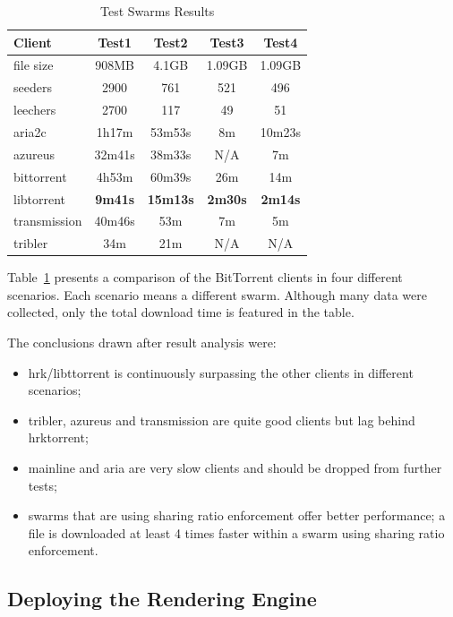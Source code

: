 \begin{table}[ht]
  \centering
  \begin{tabular}{@{}lcccc@{}}
    \toprule
    \textbf{Client} & \textbf{Test1} & \textbf{Test2} & \textbf{Test3} &
    \textbf{Test4} \\
    \midrule
    file size & 908MB & 4.1GB & 1.09GB & 1.09GB	\\
    seeders & 2900 & 761 & 521 & 496	\\
    leechers & 2700 & 117 & 49 & 51	\\
    \midrule
    aria2c & 1h17m & 53m53s & 8m & 10m23s	\\
    azureus & 32m41s & 38m33s & N/A & 7m	\\
    bittorrent & 4h53m & 60m39s & 26m & 14m	\\
    libtorrent & \textbf{9m41s} & \textbf{15m13s} & \textbf{2m30s} & \textbf{2m14s}	\\
    transmission & 40m46s & 53m & 7m & 5m	\\
    tribler & 34m & 21m & N/A & N/A		\\
    \bottomrule
  \end{tabular}
  \caption{Test Swarms Results}
  \label{table:virt-infra:testsw}
\end{table}

Table~\ref{table:virt-infra:testsw} presents a comparison of the BitTorrent
clients in four different scenarios. Each scenario means a different swarm.
Although many data were collected, only the total download time is featured in
the table.

The conclusions drawn after result analysis were:

\begin{itemize}
  \item hrk/libttorrent is continuously surpassing the other clients in 
  different scenarios;
  \item tribler, azureus and transmission are quite good clients but lag 
  behind hrktorrent;
  \item mainline and aria are very slow clients and should be dropped from 
  further tests;
  \item swarms that are using sharing ratio enforcement offer better 
  performance; a file is downloaded at least 4 times faster within a swarm 
  using sharing ratio enforcement.
\end{itemize}

\subsection{Deploying the Rendering Engine}

